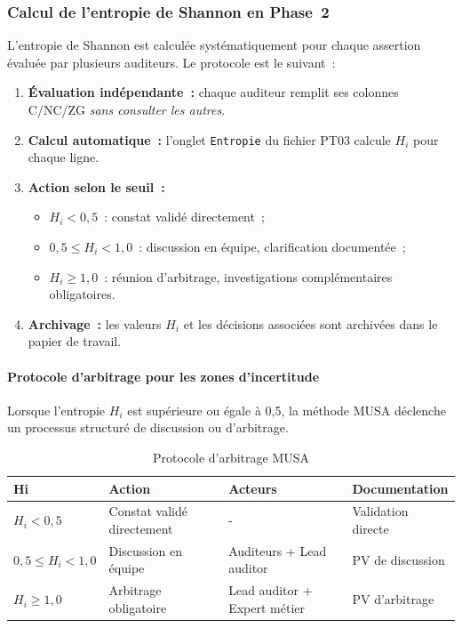 \documentclass[12pt,a4paper,oneside]{report}
\begin{document}
\subsubsection{Calcul de l'entropie de Shannon en Phase~2}

L'entropie de Shannon est calcul\'ee syst\'ematiquement pour chaque assertion
\'evalu\'ee par plusieurs auditeurs. Le protocole est le suivant~:

\begin{enumerate}[leftmargin=*, itemsep=4pt]
	\item \textbf{\'Evaluation ind\'ependante~:} chaque auditeur remplit ses colonnes
	C/NC/ZG \textit{sans consulter les autres}.
	\item \textbf{Calcul automatique~:} l'onglet \texttt{Entropie} du fichier PT03
	calcule $H_i$ pour chaque ligne.
	\item \textbf{Action selon le seuil~:}
	\begin{itemize}[label={\color{gold}}, leftmargin=*]
		\item $H_i < 0{,}5$~: constat valid\'e directement~;
		\item $0{,}5 \leq H_i < 1{,}0$~: discussion en \'equipe, clarification
		document\'ee~;
		\item $H_i \geq 1{,}0$~: r\'eunion d'arbitrage, investigations
		compl\'ementaires obligatoires.
	\end{itemize}
	\item \textbf{Archivage~:} les valeurs $H_i$ et les d\'ecisions associ\'ees sont
	archiv\'ees dans le papier de travail.
\end{enumerate}

\paragraph{Protocole d'arbitrage pour les zones d'incertitude}

Lorsque l'entropie $H_i$ est supérieure ou égale à 0,5, la méthode MUSA déclenche un processus structuré de discussion ou d'arbitrage.

\begin{table}[H]
	\centering\small
	\caption{Protocole d'arbitrage MUSA}
	\label{tab:arbitrage}
	\begin{tabularx}{\textwidth}{|p{2.5cm}|p{4.5cm}|p{3cm}|p{2.5cm}|}
		\hline
		\rowcolor{theadcolor}
		\color{white}\textbf{Hi} &
		\color{white}\textbf{Action} &
		\color{white}\textbf{Acteurs} &
		\color{white}\textbf{Documentation} \\
		\hline
		$H_i < 0,5$ & Constat validé directement & -& Validation directe \\
		\hline
		$0,5 \leq H_i < 1,0$ & Discussion en équipe & Auditeurs + Lead auditor & PV de discussion \\
		\hline
		$H_i \geq 1,0$ & Arbitrage obligatoire & Lead auditor + Expert métier & PV d'arbitrage \\
		\hline
	\end{tabularx}
\end{table}
\end{document}
